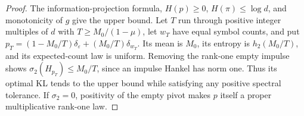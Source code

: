 \begin{proof}
The information-projection formula, $H(p)\ge0$, $H(\pi)\le\log d$,
and monotonicity of $g$ give the upper bound. Let $T$ run through
positive integer multiples of $d$ with $T\ge M_0/(1-\mu)$, let $w_T$ have equal symbol counts, and put
$p_T=(1-M_0/T)\delta_\varepsilon+(M_0/T)\delta_{w_T}$.
Its mean is $M_0$, its entropy is $h_2(M_0/T)$, and its expected-count
law is uniform. Removing the rank-one empty impulse shows
$\sigma_2(H_{p_T})\le M_0/T$, since an impulse Hankel has norm one.
Thus its optimal KL tends to the upper bound while satisfying any
positive spectral tolerance. If $\sigma_2=0$, positivity of the empty
pivot makes $p$ itself a proper multiplicative rank-one law.
\end{proof}
